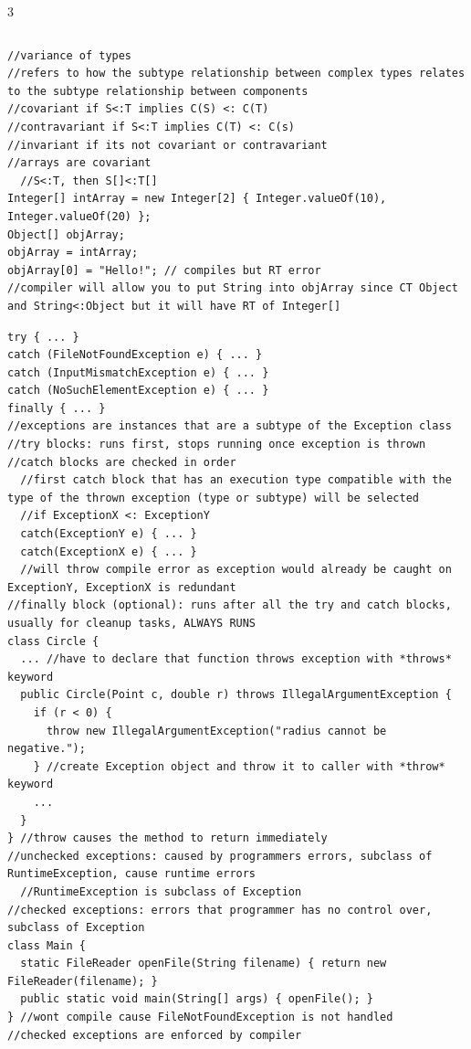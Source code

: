 \documentclass[10pt,a4paper]{article}
\begin{document}
\begin{multicols*}{3}
\begin{verbatim}
\end{verbatim}
\begin{verbatim}
//variance of types
//refers to how the subtype relationship between complex types relates to the subtype relationship between components
//covariant if S<:T implies C(S) <: C(T)
//contravariant if S<:T implies C(T) <: C(s)
//invariant if its not covariant or contravariant
//arrays are covariant
  //S<:T, then S[]<:T[]
Integer[] intArray = new Integer[2] { Integer.valueOf(10), Integer.valueOf(20) };
Object[] objArray;
objArray = intArray;
objArray[0] = "Hello!"; // compiles but RT error
//compiler will allow you to put String into objArray since CT Object and String<:Object but it will have RT of Integer[]
\end{verbatim}
\begin{verbatim}
try { ... }
catch (FileNotFoundException e) { ... }
catch (InputMismatchException e) { ... }
catch (NoSuchElementException e) { ... }
finally { ... }
//exceptions are instances that are a subtype of the Exception class
//try blocks: runs first, stops running once exception is thrown
//catch blocks are checked in order
  //first catch block that has an execution type compatible with the type of the thrown exception (type or subtype) will be selected
  //if ExceptionX <: ExceptionY
  catch(ExceptionY e) { ... } 
  catch(ExceptionX e) { ... }
  //will throw compile error as exception would already be caught on ExceptionY, ExceptionX is redundant
//finally block (optional): runs after all the try and catch blocks, usually for cleanup tasks, ALWAYS RUNS
class Circle {
  ... //have to declare that function throws exception with *throws* keyword
  public Circle(Point c, double r) throws IllegalArgumentException {
    if (r < 0) {
      throw new IllegalArgumentException("radius cannot be negative.");
    } //create Exception object and throw it to caller with *throw* keyword
    ...
  }
} //throw causes the method to return immediately
//unchecked exceptions: caused by programmers errors, subclass of RuntimeException, cause runtime errors
  //RuntimeException is subclass of Exception
//checked exceptions: errors that programmer has no control over, subclass of Exception
class Main {
  static FileReader openFile(String filename) { return new FileReader(filename); }
  public static void main(String[] args) { openFile(); }
} //wont compile cause FileNotFoundException is not handled
//checked exceptions are enforced by compiler

\end{verbatim}
\end{multicols*}
\end{document}
